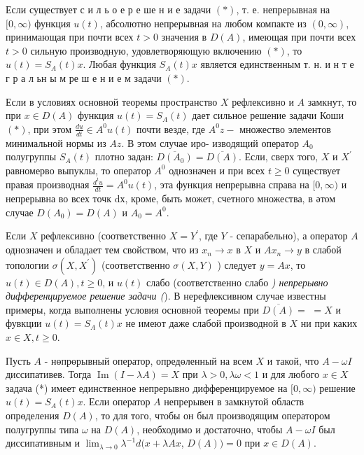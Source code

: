 \documentclass[10pt]{article}
\begin{document}
Если существует с и л ь о е р е ше н и е задачи $(*)$, т. е. непрерывная на $[0, \infty)$ функция $u(t)$, абсолютно непрерывная на любом компакте из $(0, \infty)$, принимающая при почти всех $t>0$ значения в $D(A)$, имеющая при почти всех $t>0$ сильную производную, удовлетворяющую включению $(*)$, то $u(t)=S_{A}(t) x$. Любая функция $S_{A}(t) x$ является единственным т. н. и н т е г р а л ьн ы м ре ш е н и е м задачи $(*)$.



Если в условиях основной теоремы пространство $X$ рефлексивно и $A$ замкнут, то при $x \in D(A)$ функция $u(t)=S_{A}(t)$ дает сильное решение задачи Коши $(*)$, при этом $\frac{d u}{d t} \in A^{0} u(t)$ почти везде, где $A^{0} z-$ множество элементов минимальной нормы из $A z$. В этом случае иро- изводящий оператор $A_{0}$ полугруппы $S_{A}(t)$ плотно задан: $\overline{D\left(A_{0}\right)}=\overline{D(A)}$. Если, сверх того, $X$ и $X^{\prime}$ равномерво выпуклы, то оператор $A^{0}$ однозначен и при всех $t \geqslant 0$ существует правая производная $\frac{d^{t} u}{d t}=A^{0} u(t)$, эта функция непрерывна справа на $[0, \infty)$ и непрерывна во всех точк dх, кроме, быть может, счетного множества, в әтом случае $D\left(A_{0}\right)=D(A)$ и $A_{0}=A^{0}$.



Если $X$ рефлексивно (соответственно $X=Y^{\prime}$, где $Y$ - сепарабельно), а оператор $A$ однозначен и обладает тем свойством, что из $x_{n} \rightarrow x$ в $X$ и $A x_{n} \rightarrow y$ в слабой топологии $\sigma\left(X, X^{\prime}\right)$ (соответственно $\sigma(X, Y)$ ) следует $y=A x$, то $u(t) \in D(A), t \geqslant 0$, и $u(t)$ слабо (соответственно слабо \textit{) непрерывно дифференцируемое решение задачи (}). В нерефлексивном случае известны примеры, когда выполнены условия основной теоремы при $\overline{D(A)}=$ $=X$ и фувкции $u(t)=S_{A}(t) x$ не имеют даже слабой производной в $X$ ни при каких $x \in X, t \geqslant 0$.



Пусть $A$ - нөпрөрывный оператор, опредөленный на всем $X$ и такой, что $A-\omega I$ диссипативев. Тогда $\operatorname{Im}(I-\lambda A)=X$ при $\lambda>0, \lambda \omega<1$ и для любого $x \in X$ задача (*) имеет единственное непрерывно дифференцируемое на $[0, \infty)$ решение $u(t)=S_{A}(t) x$. Если оператор $A$ непрерывен в замкнутой областв опрөделения $D(A)$, то для того, чтобы он был производящим оператором полугруппы типа $\omega$ на $D(A)$, необходимо и достаточно, чтобы $A-\omega I$ был диссипативным и $\lim _{\lambda \rightarrow 0} \lambda^{-1} d(x+\lambda A x$, $D(A))=0$ при $x \in D(A)$.
\end{document}

